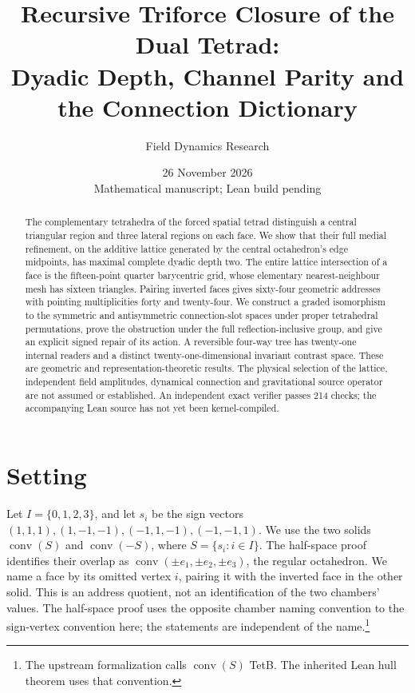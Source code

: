 \documentclass[10pt,a4paper,twocolumn]{article}
\title{Recursive Triforce Closure of the Dual Tetrad:\\Dyadic Depth, Channel Parity and the Connection Dictionary}
\author{Field Dynamics Research}
\date{26 November 2026\\\small Mathematical manuscript; Lean build pending}
\newcommand{\conv}{\operatorname{conv}}
\begin{document}
\maketitle
\begin{abstract}
The complementary tetrahedra of the forced spatial tetrad distinguish a central triangular region and three lateral regions on each face. We show that their full medial refinement, on the additive lattice generated by the central octahedron's edge midpoints, has maximal complete dyadic depth two. The entire lattice intersection of a face is the fifteen-point quarter barycentric grid, whose elementary nearest-neighbour mesh has sixteen triangles. Pairing inverted faces gives sixty-four geometric addresses with pointing multiplicities forty and twenty-four. We construct a graded isomorphism to the symmetric and antisymmetric connection-slot spaces under proper tetrahedral permutations, prove the obstruction under the full reflection-inclusive group, and give an explicit signed repair of its action. A reversible four-way tree has twenty-one internal readers and a distinct twenty-one-dimensional invariant contrast space. These are geometric and representation-theoretic results. The physical selection of the lattice, independent field amplitudes, dynamical connection and gravitational source operator are not assumed or established. An independent exact verifier passes 214 checks; the accompanying Lean source has not yet been kernel-compiled.
\end{abstract}

\section*{Setting}
Let $I=\{0,1,2,3\}$, and let $s_i$ be the sign vectors $(1,1,1),(1,-1,-1),(-1,1,-1),(-1,-1,1)$. We use the two solids $\conv(S)$ and $\conv(-S)$, where $S=\{s_i:i\in I\}$. The half-space proof identifies their overlap as $\conv(\pm e_1,\pm e_2,\pm e_3)$, the regular octahedron. We name a face by its omitted vertex $i$, pairing it with the inverted face in the other solid. This is an address quotient, not an identification of the two chambers' values. The half-space proof uses the opposite chamber naming convention to the sign-vertex convention here; the statements are independent of the name.\footnote{The upstream formalization calls $\conv(S)$ TetB. The inherited Lean hull theorem uses that convention.}
\end{document}
